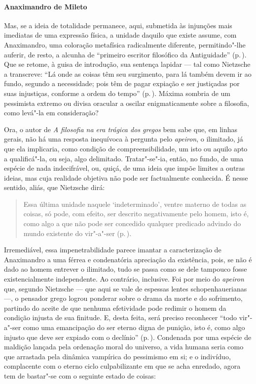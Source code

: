 \paragraph{Anaximandro de Mileto} Mas, se a ideia de totalidade permanece,
 aqui, submetida às injunções mais imediatas de uma expressão física, a
 unidade daquilo que existe assume, com Anaximandro, uma coloração metafísica
 radicalmente diferente, permitindo"-lhe auferir, de resto, a alcunha de
 ``primeiro escritor filosófico da Antiguidade'' (p.\,\pageref{primeiroescritor}). 
 Que se retome, à guisa de introdução, sua sentença
 lapidar --- tal como Nietzsche a transcreve: ``Lá onde as coisas têm seu
 surgimento, para lá também devem ir ao fundo, segundo a necessidade; pois
 têm de pagar expiação e ser justiçadas por suas injustiças, conforme a ordem
 do tempo'' (p.\,\pageref{laondeascoisas}). Máxima sombria de um pessimista
 extremo ou divisa oracular a oscilar enigmaticamente sobre a filosofia, como
 levá"-la em consideração? 

Ora, o autor de \textit{A filosofia na era trágica dos gregos} bem sabe que,
em linhas gerais, não há uma resposta inequívoca à pergunta pelo
\textit{apeiron}, o ilimitado, já que ela implicaria, como condição de
 compreensibilidade, um isto ou aquilo apto a qualificá"-la, ou seja, algo
 delimitado. Tratar"-se"-ia, então, no fundo, de uma espécie de nada
 indecifrável, ou, quiçá, de uma ideia que impõe limites a outras ideias, mas
 cuja realidade objetiva não pode ser factualmente conhecida. É nesse
 sentido, aliás, que Nietzsche dirá:

\begin{quote} 
Essa última unidade naquele `indeterminado', ventre materno
 de todas as coisas, só pode, com efeito, ser descrito negativamente pelo
 homem, isto é, como algo a que não pode ser concedido qualquer predicado
 advindo do mundo existente do vir"-a"-ser (p.\,\pageref{essaultimaunidade}).
\end{quote} 

 Irremediável, essa impenetrabilidade parece imantar a caracterização de
 Anaximandro a uma férrea e condenatória apreciação da existência, pois, se
 não é dado ao homem entrever o ilimitado, tudo se passa como se dele
 tampouco fosse existencialmente independente. Ao contrário, inclusive. Foi
 por meio do \textit{apeiron} que, segundo Nietzsche --- que aqui se vale de
 espessas lentes schopenhauerianas ---, o pensador grego logrou ponderar sobre
 o drama da morte e do sofrimento, partindo do aceite de que nenhuma
 efetividade pode redimir o homem da condição injusta de sua finitude. E,
 desta feita, será preciso reconhecer ``todo vir"-a"-ser como uma emancipação
 do ser eterno digna de punição, isto é, como algo injusto que deve ser
 expiado com o declínio'' (p.\,\pageref{sereterno}). Condenada por uma espécie
 de maldição lançada pela ordenação moral do universo, a vida humana seria
 como que arrastada pela dinâmica vampírica do pessimismo em si; e o
 indivíduo, complacente com o eterno ciclo culpabilizante em que se acha
 enredado, agora tem de bastar"-se com o seguinte estado de coisas: 

